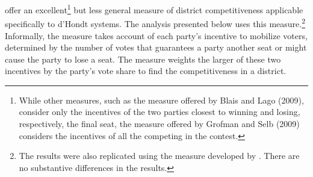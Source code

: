 \documentclass[12pt]{article}
\begin{document}
\cite{GrofmanSelb2009} offer an excellent\footnote{While other measures, such as the measure offered by Blais and Lago (2009), consider only the incentives of the two parties closest to winning and losing, respectively, the final seat, the measure offered by Grofman and Selb (2009) considers the incentives of all the competing in the contest. } but less general measure of district competitiveness applicable specifically to d'Hondt systems. The analysis presented below uses this measure.\footnote{The results were also replicated using the measure developed by \cite{BlaisLago2009}. There are no substantive differences in the results.} Informally, the measure takes account of each party's incentive to mobilize voters, determined by the number of votes that guarantees a party another seat or might cause the party to lose a seat. The measure weights the larger of these two incentives by the party's vote share to find the competitiveness in a district. 
\end{document}

